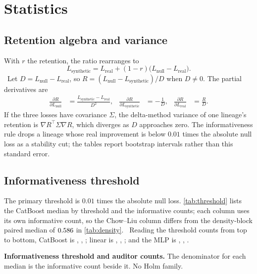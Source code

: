 \documentclass{article}
\begin{document}
\section{Statistics}
\label{app:stats}
\subsection{Retention algebra and variance}
\label{app:retention-variance}
With $r$ the retention, the ratio rearranges to
\[
L_{\mathrm{synthetic}} = L_{\mathrm{real}} + (1-r)\bigl(L_{\mathrm{null}}-L_{\mathrm{real}}\bigr).
\]
\RetentionAlgebra\ Let $D = L_{\mathrm{null}} - L_{\mathrm{real}}$, so $R = (L_{\mathrm{null}} - L_{\mathrm{synthetic}}) / D$ when $D \neq 0$. The partial derivatives are
\begin{align*}
\frac{\partial R}{\partial L_{\mathrm{null}}} &= \frac{L_{\mathrm{synthetic}} - L_{\mathrm{real}}}{D^{2}}, &
\frac{\partial R}{\partial L_{\mathrm{synthetic}}} &= -\frac{1}{D}, &
\frac{\partial R}{\partial L_{\mathrm{real}}} &= \frac{R}{D}.
\end{align*}
If the three losses have covariance $\Sigma$, the delta-method variance of one lineage's retention is $\nabla R^{\top} \Sigma \nabla R$, which diverges as $D$ approaches zero. The informativeness rule drops a lineage whose real improvement is below $0.01$ times the absolute null loss as a stability cut; the tables report bootstrap intervals rather than this standard error.

\subsection{Informativeness threshold}
The primary threshold is $0.01$ times the absolute null loss. \cref{tab:threshold} lists the CatBoost median by threshold and the informative counts; each column uses its own informative count, so the Chow--Liu column differs from the density-block paired median of $0.586$ in \cref{tab:density}. \ThrSentence\ Reading the threshold counts from top to bottom, CatBoost is \NThrLowCb, \NThrMidCb, \NThrHighCb; linear is \NThrLowLin, \NThrMidLin, \NThrHighLin; and the MLP is \NThrLowMlp, \NThrMidMlp, \NThrHighMlp.

\begin{table}[t]
\caption{\textbf{Informativeness threshold and auditor counts.} The denominator for each median is the informative count beside it. No Holm family.}
\label{tab:threshold}
\centering
\footnotesize
\resizebox{\linewidth}{!}{\begin{minipage}{7.16in}\end{minipage}}
\medskip
\resizebox{\linewidth}{!}{\begin{minipage}{7.16in}\end{minipage}}
\end{table}
\end{document}
